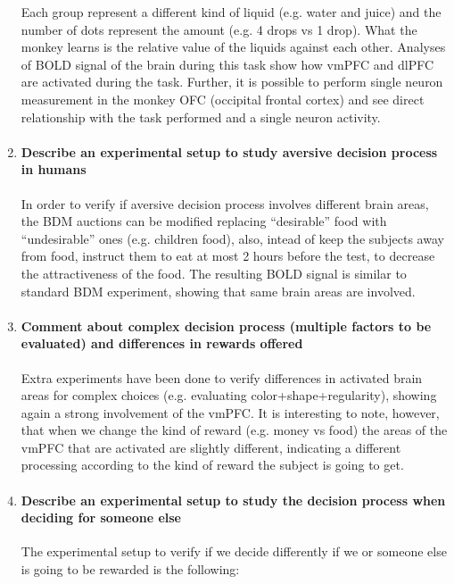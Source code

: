 \documentclass[12pt,article,oneside,a4paper]{memoir}
\begin{document}
\begin{enumerate}
Each group represent a different kind of liquid (e.g. water and juice) and the
number of dots represent the amount (e.g. 4 drops vs 1 drop). What the monkey
learns is the relative value of the liquids against each other. Analyses of
BOLD signal of the brain during this task show how vmPFC and dlPFC are
activated during the task. Further, it is possible to perform single neuron
measurement in the monkey OFC (occipital frontal cortex) and see direct
relationship with the task performed and a single neuron activity.

\item \paragraph{Describe an experimental setup to study aversive decision
process in humans}

In order to verify if aversive decision process involves different brain areas,
the BDM auctions can be modified replacing ``desirable'' food with
``undesirable'' ones (e.g. children food), also, intead of keep the subjects
away from food, instruct them to eat at most 2 hours before the test, to
decrease the attractiveness of the food. The resulting BOLD signal is similar
to standard BDM experiment, showing that same brain areas are involved.

\item \paragraph{Comment about complex decision process (multiple factors to be
evaluated) and differences in rewards offered}

Extra experiments have been done to verify differences in activated brain areas
for complex choices (e.g. evaluating color+shape+regularity), showing again a
strong involvement of the vmPFC. It is interesting to note, however, that when
we change the kind of reward (e.g. money vs food) the areas of the vmPFC that
are activated are slightly different, indicating a different processing
according to the kind of reward the subject is going to get.

\item \paragraph{Describe an experimental setup to study the decision process
when deciding for someone else}

The experimental setup to verify if we decide differently if we or someone else
is going to be rewarded is the following:


\end{enumerate}
\end{document}
